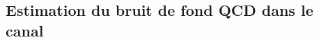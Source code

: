 \subsection{Estimation du bruit de fond QCD dans le canal \ele\mu}\label{chapter-HTT_analysis-section-bg_estimation-QCD-SS}

%
